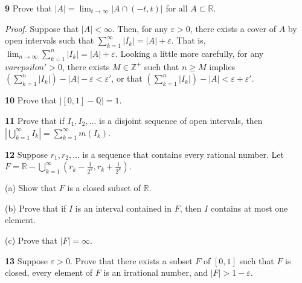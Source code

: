 \documentclass[a4paper]{article}
\newcommand{\R}{\mathbb{R}}
\newcommand{\Q}{\mathbb{Q}}
\newcommand{\Z}{\mathbb{Z}}
\begin{document}
\textbf{9} Prove that $|A| = \lim_{t \to \infty} |A \cap (-t, t)|$ for all $A \subset \R$.

\emph{Proof.} Suppose that $|A| < \infty$. Then, for any $\varepsilon > 0$, there exists a cover of $A$ by open intervals such that $\displaystyle \sum_{k=1}^\infty |I_k| = |A| + \varepsilon$. That is, $\displaystyle \lim_{n \to \infty} \sum_{k=1}^n |I_k| = |A| + \varepsilon$. Looking a little more carefully, for any $varepsilon' > 0$, there exists $M \in \Z^+$ such that $n \geq M$ implies $\displaystyle \left(\sum_{k=1}^n |I_k|\right) - |A| - \varepsilon < \varepsilon'$, or that $\displaystyle \left(\sum_{k=1}^n |I_k|\right) - |A| < \varepsilon + \varepsilon'$.

\textbf{10} Prove that $|[0, 1] - \Q| = 1$.

\textbf{11} Prove that if $I_1, I_2, \ldots$ is a disjoint sequence of open intervals, then $\left|\bigcup_{k=1}^\infty I_k\right| = \sum_{k=1}^\infty m(I_k)$.

\textbf{12} Suppose $r_1, r_2, \ldots$ is a sequence that contains every rational number. Let $F = \R - \bigcup_{k=1}^\infty \left(r_k - \frac{1}{2^k}, r_k + \frac{1}{2^k}\right)$.

(a) Show that $F$ is a closed subset of $\R$.

(b) Prove that if $I$ is an interval contained in $F$, then $I$ contains at most one element.

(c) Prove that $|F| = \infty$.

\textbf{13} Suppose $\varepsilon > 0$. Prove that there exists a subset $F$ of $[0, 1]$ such that $F$ is closed, every element of $F$ is an irrational number, and $|F| > 1 - \varepsilon$.
\end{document}
